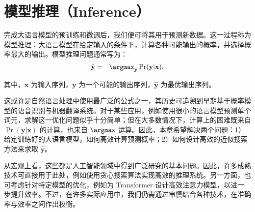 
%




\chapter{模型推理（Inference）}

\thispagestyle{chapterurl} %

完成大语言模型的预训练和微调后，我们便可将其用于预测新数据。这一过程称为模型推理：大语言模型在给定输入的条件下，计算各种可能输出的概率，并选择概率最大的输出。模型推理问题通常写为：
\begin{eqnarray}
\hat{\mathbf{y}} & = & \argmax_{\mathbf{y}} \Pr(\mathbf{y}|\mathbf{x}), \label{eq:llm-argmax-base}
\end{eqnarray}

\noindent 其中，$\mathbf{x}$ 为输入序列，$\mathbf{y}$ 为一个可能的输出序列，$\hat{\mathbf{y}}$ 为最优输出序列。

这或许是自然语言处理中使用最广泛的公式之一，其历史可追溯到早期基于概率模型的语音识别与机器翻译系统。对于某些应用，例如使用很小的语言模型预测单个词元，求解这一优化问题似乎十分简单；但在大多数情况下，计算上的困难既来自 $\Pr(\mathbf{y}|\mathbf{x})$ 的计算，也来自 $\argmax$ 运算。因此，本章希望解决两个问题：1）给定训练好的大语言模型，如何高效计算预测概率；2）如何设计高效的近似搜索方法来求取 $\hat{\mathbf{y}}$。

从宏观上看，这些都是人工智能领域中得到广泛研究的基本问题。因此，许多成熟技术可直接用于此处，例如使用贪心搜索算法实现高效的推理系统。另一方面，也可考虑针对特定模型的优化，例如为 Transformer 设计高效注意力模型，以进一步提升效率。不过，在许多实际应用中，我们仍需通过审慎结合各种技术，在准确率与效率之间作出权衡。

